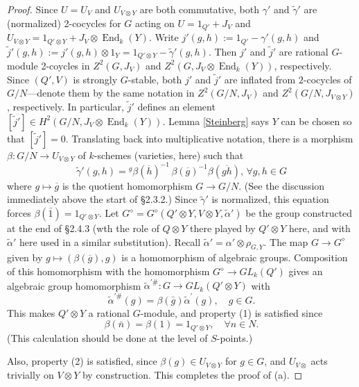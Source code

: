 \documentclass[11pt,leqno,amscd,amssymb,verbatim, url]{amsart}
\theoremstyle{definition}
\numberwithin{equation}{thm}
\newcommand{\End}{\operatorname{End}}
\begin{document}
\begin{proof}
Since $U=U_V$ and $U_{V\otimes Y}$ are
 both commutative, both $\gamma'$ and $\widetilde\gamma'$ are (normalized) 2-cocycles for $G$ acting on
  $U=1_{Q'}+J_V$ and $U_{V\otimes Y}=1_{Q'\otimes Y}+J_V\otimes\End_k(Y)$. 
Write $j'(g,h):= 1_{Q'}-\gamma'(g,h)$ and $\widetilde j'(g,h):=j'(g,h)\otimes 1_Y=1_{Q'\otimes Y}-\widetilde \gamma'(g,h)$. Then $j'$ and $\widetilde j'$ are rational $G$-module 2-coycles in $Z^2(G,J_V)$ and $Z^2(G,J_V\otimes\End_k(Y))$, respectively.
Since $(Q',V)$ is strongly $G$-stable, both $j'$ and $\widetilde j'$ are inflated from $2$-cocycles of $G/N$---denote them by the same notation
in $Z^2(G/N,J_V)$ and $Z^2(G/N,J_{V\otimes Y})$, respectively.
 In particular, $\widetilde j'$ defines an element $[\widetilde j']\in H^2(G/N,J_V\otimes \End_k(Y))$. Lemma \ref{Steinberg} says $Y$
 can be chosen so that $[\widetilde j']=0$. Translating back into multiplicative notation, there is a morphism $\beta:G/N\to U_{V\otimes Y}$ of $k$-schemes (varieties, here) such that
$$\widetilde\gamma'(g,h)={^g\beta}(\overline h)^{-1}\, {\beta}(\overline g)^{-1}\beta(\overline{gh}), \,\forall g,h\in G$$ 
where $g\mapsto \overline g$ is the quotient homomorphism $G\to G/N$. (See the discussion immediately
above the start of \S2.3.2.) Since $\widetilde\gamma'$ is
normalized, this equation forces $\beta(\bar 1)=1_{Q'\otimes Y}$.  Let $G^\diamond=G^\diamond(Q'\otimes Y,V\otimes Y,\widetilde\alpha')$ be the group
constructed at the end of  \S2.4.3 (wth the role of $Q\otimes Y$ there played by $Q'\otimes Y$ here,
and with $\widetilde\alpha'$ here used in a similar substitution). Recall $\widetilde\alpha'=\alpha'\otimes\rho_{G,Y}$.  The map $G\to G^\diamond$ given by $g\mapsto (\beta(\overline g),g)$
is a homomorphism of algebraic groups. Composition of this homomorphism with the homomorphism $G^\diamond\to GL_k(Q')$
gives an algebraic group homomorphism $\widetilde\alpha^{\prime\#}:G\to GL_k(Q'\otimes Y)$ with
$$\widetilde \alpha^{\prime\#}(g)=\beta(\bar g)\widetilde\alpha^{\prime}(g), \quad g\in G.$$
This makes $Q'\otimes Y$ a rational $G$-module, and property (1) is satisfied since 
$$\beta(\bar n)=\beta(1)=1_{Q'\otimes Y},\quad \forall n\in N.$$
(This calculation should be done at the level of $S$-points.)  
 
 Also, property (2) is satisfied, since $\beta(g)\in U_{V\otimes Y}$ for $g\in G$, and $U_{V\otimes}$ acts trivially on $V\otimes Y$ by
 construction. This completes the proof of (a).
   

\end{proof}
\end{document}

